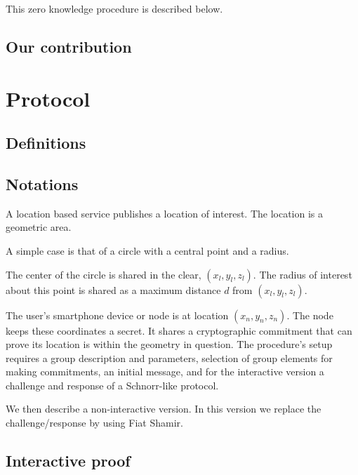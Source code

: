 \documentclass{article}
\begin{document}
{This zero knowledge procedure is described below. 

\subsection{Our contribution}

\section{Protocol}
\subsection{Definitions}


\subsection{Notations}

A location based service publishes a location of interest. 
The location is a geometric area. 

A simple case is that of a circle with a central point and a radius. 

The center of the circle is shared in the clear, $(x_l, y_l, z_l)$. 
The radius of interest about this point is shared as a maximum distance $d$ from $(x_l, y_l, z_l)$. 

The user's smartphone device or node is at location $(x_n, y_n, z_n )$. 
The node keeps these coordinates a secret. 
It shares a cryptographic commitment that can prove its location is within the geometry in question. 
The procedure's setup requires a group description and parameters, selection of group elements for making commitments,
an initial message, and for the interactive version a challenge and response of a Schnorr-like protocol.

We then describe a non-interactive version. In this version we replace the challenge/response by using Fiat Shamir. 

\subsection{Interactive proof}

}
\end{document}
